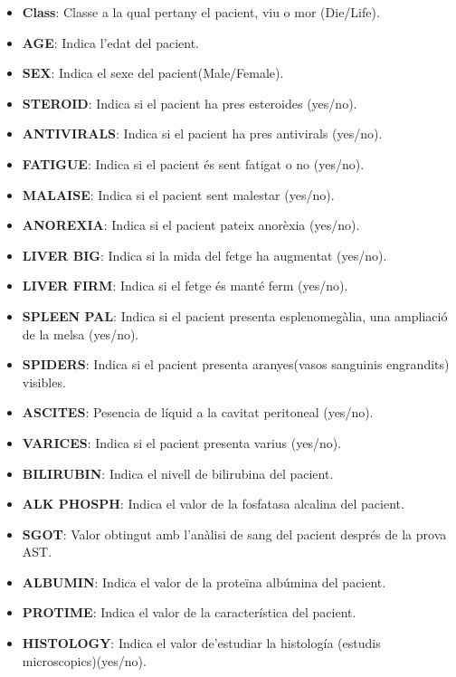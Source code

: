 \documentclass[]{article}
\providecommand{\tightlist}{%
  \setlength{\itemsep}{0pt}\setlength{\parskip}{0pt}}
\begin{document}
\begin{itemize}
\tightlist
\item
  \textbf{Class}: Classe a la qual pertany el pacient, viu o mor
  (Die/Life).
\item
  \textbf{AGE}: Indica l'edat del pacient.
\item
  \textbf{SEX}: Indica el sexe del pacient(Male/Female).
\item
  \textbf{STEROID}: Indica si el pacient ha pres esteroides (yes/no).
\item
  \textbf{ANTIVIRALS}: Indica si el pacient ha pres antivirals (yes/no).
\item
  \textbf{FATIGUE}: Indica si el pacient és sent fatigat o no (yes/no).
\item
  \textbf{MALAISE}: Indica si el pacient sent malestar (yes/no).
\item
  \textbf{ANOREXIA}: Indica si el pacient pateix anorèxia (yes/no).
\item
  \textbf{LIVER BIG}: Indica si la mida del fetge ha augmentat (yes/no).
\item
  \textbf{LIVER FIRM}: Indica si el fetge és manté ferm (yes/no).
\item
  \textbf{SPLEEN PAL}: Indica si el pacient presenta esplenomegàlia, una
  ampliació de la melsa (yes/no).
\item
  \textbf{SPIDERS}: Indica si el pacient presenta aranyes(vasos
  sanguinis engrandits) visibles.
\item
  \textbf{ASCITES}: Pesencia de líquid a la cavitat peritoneal (yes/no).
\item
  \textbf{VARICES}: Indica si el pacient presenta varius (yes/no).
\item
  \textbf{BILIRUBIN}: Indica el nivell de bilirubina del pacient.
\item
  \textbf{ALK PHOSPH}: Indica el valor de la fosfatasa alcalina del
  pacient.
\item
  \textbf{SGOT}: Valor obtingut amb l'anàlisi de sang del pacient
  després de la prova AST.
\item
  \textbf{ALBUMIN}: Indica el valor de la proteïna albúmina del pacient.
\item
  \textbf{PROTIME}: Indica el valor de la característica del pacient.\\
\item
  \textbf{HISTOLOGY}: Indica el valor de'estudiar la histología (estudis
  microscopics)(yes/no).
\end{itemize}
\end{document}
